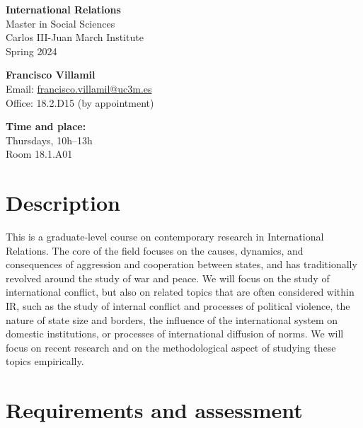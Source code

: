 \documentclass[12pt, a4paper]{article}
\begin{document}
\begin{center}
{\LARGE\bf International Relations}\\\vspace{10pt}
Master in Social Sciences\\Carlos III-Juan March Institute\\
\vspace{10pt}
{\large Spring 2024}\\
\end{center}

\vspace{15pt}

\begin{minipage}{0.6\textwidth}
\textbf{Francisco Villamil}\\
Email: \href{francisco.villamil@uc3m.es}{francisco.villamil@uc3m.es}\\
Office: 18.2.D15 (by appointment)
\end{minipage}\hfill
\begin{minipage}{0.39\textwidth}
\centering
\textbf{Time and place:}\\
Thursdays, 10h--13h\\Room 18.1.A01
\end{minipage}


\section{Description}

This is a graduate-level course on contemporary research in International Relations. The core of the field focuses on the causes, dynamics, and consequences of aggression and cooperation between states, and has traditionally revolved around the study of war and peace.
We will focus on the study of international conflict, but also on related topics that are often considered within IR, such as the study of internal conflict and processes of political violence, the nature of state size and borders, the influence of the international system on domestic institutions, or processes of international diffusion of norms.
We will focus on recent research and on the methodological aspect of studying these topics empirically.

\section{Requirements and assessment}
\end{document}
